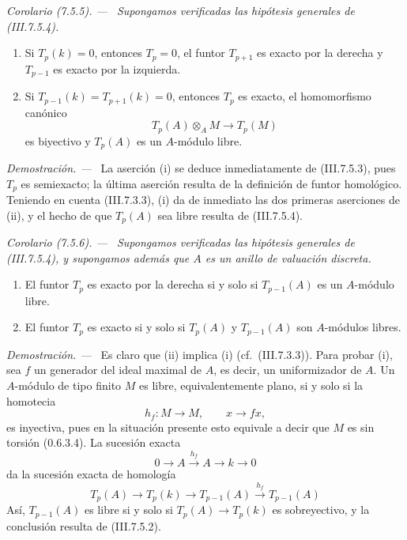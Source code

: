 \documentclass[10pt,oneside]{book}
\newcommand{\sref}[2][]{\textup{(#2)}}
\newcommand{\oldpage}[2][]{\setcounter{footnote}{0}\marginpar{\scriptsize\textbf{#1}~|~#2}\ignorespaces}
\newenvironment{corollary}[1][]{\par\medskip\noindent\itshape Corolario (#1). ---\ }{\par}
\newenvironment{proof}{\par\medskip\noindent\textit{Demostración. ---\ }}{\par}
\begin{document}
\begin{corollary}[7.5.5]
\label{III.7.5.5}
Supongamos verificadas las hipótesis generales de
\sref{III.7.5.4}.
\begin{enumerate}
  \item[\textup{(i)}] Si $T_p(k)=0$, entonces $T_p=0$, el funtor $T_{p+1}$
    es exacto por la derecha y $T_{p-1}$ es exacto por la izquierda.
  \item[\textup{(ii)}] Si $T_{p-1}(k)=T_{p+1}(k)=0$, entonces $T_p$ es
    exacto, el homomorfismo canónico
    \[
      T_p(A)\otimes_A M
      \longrightarrow
      T_p(M)
    \]
    es biyectivo y $T_p(A)$ es un $A$-módulo libre.
\end{enumerate}
\end{corollary}

\begin{proof}
La aserción (i) se deduce inmediatamente de \sref{III.7.5.3}, pues
$T_p$ es semiexacto; la última aserción resulta de la definición de
funtor homológico. Teniendo en cuenta \sref{III.7.3.3}, (i) da de
inmediato las dos primeras aserciones de (ii), y el hecho de que
$T_p(A)$ sea libre resulta de \sref{III.7.5.4}.
\end{proof}

\begin{corollary}[7.5.6]
\label{III.7.5.6}
Supongamos verificadas las hipótesis generales de
\sref{III.7.5.4}, y supongamos además que $A$ es un anillo de
valuación discreta.
\begin{enumerate}
  \item[\textup{(i)}] El funtor $T_p$ es exacto por la derecha si y solo si
    $T_{p-1}(A)$ es un $A$-módulo libre.
  \item[\textup{(ii)}] El funtor $T_p$ es exacto si y solo si $T_p(A)$ y
    $T_{p-1}(A)$ son $A$-módulos libres.
\end{enumerate}
\end{corollary}

\oldpage[III]{192}
\begin{proof}
Es claro que (ii) implica (i) (cf.\ \sref{III.7.3.3}). Para probar
(i), sea $f$ un generador del ideal maximal de $A$, es decir, un
uniformizador de $A$. Un $A$-módulo de tipo finito $M$ es libre,
equivalentemente plano, si y solo si la homotecia
\[
  h_f:M\longrightarrow M,\qquad x\to fx,
\]
es inyectiva, pues en la situación presente esto equivale a decir
que $M$ es sin torsión \sref[0]{0.6.3.4}. La sucesión exacta
\[
  0
  \longrightarrow A
  \xrightarrow{h_f}
  A
  \longrightarrow k
  \longrightarrow 0
\]
da la sucesión exacta de homología
\[
  T_p(A)
  \longrightarrow T_p(k)
  \longrightarrow T_{p-1}(A)
  \xrightarrow{h_f}
  T_{p-1}(A)
\]
Así, $T_{p-1}(A)$ es libre si y solo si
$T_p(A)\to T_p(k)$ es sobreyectivo, y la conclusión resulta de
\sref{III.7.5.2}.
\end{proof}
\end{document}
